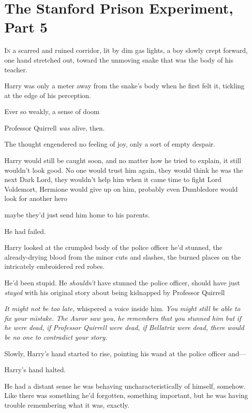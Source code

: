 \chapter{The Stanford Prison Experiment, Part 5}

\lettrine{I}{n} a scarred and
ruined corridor, lit by dim gas lights, a boy slowly crept forward, one hand
stretched out, toward the unmoving snake that was the body of his teacher.

Harry was only a meter away from the snake's body when he first felt it,
tickling at the edge of his perception.

Ever so weakly, a sense of doom{\el}

Professor Quirrell \emph{was} alive, then.

The thought engendered no feeling of joy, only a sort of empty despair.

Harry would still be caught soon, and no matter how he tried to explain, it
still wouldn't look good. No one would trust him again, they would think he was
the next Dark Lord, they wouldn't help him when it came time to fight Lord
Voldemort, Hermione would give up on him, probably even Dumbledore would look
for another hero{\el}

{\el} maybe they'd just send him home to his parents.

He had failed.

Harry looked at the crumpled body of the police officer he'd stunned, the
already-drying blood from the minor cuts and slashes, the burned places on the
intricately embroidered red robes.

He'd been stupid. He \emph{shouldn't} have stunned the police officer, should
have just \emph{stayed} with his original story about being kidnapped by
Professor Quirrell{\el}

\emph{It might not be too late,} whispered a voice inside him. \emph{You might
still be able to fix your mistake. The Auror saw you, he remembers that you
stunned him{\el} but if he were dead, if Professor Quirrell were dead, if
Bellatrix were dead, there would be no one to contradict your story.}

Slowly, Harry's hand started to rise, pointing his wand at the police officer
and---

Harry's hand halted.

He had a distant sense he was behaving uncharacteristically of himself,
somehow. Like there was something he'd forgotten, something important, but he
was having trouble remembering what it was, exactly.

